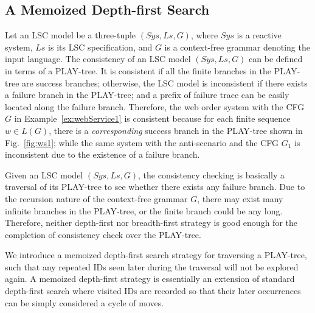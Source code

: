 \documentclass[]{llncs}
\begin{document}
\subsection{A Memoized Depth-first Search}

Let an LSC model be a three-tuple $(Sys, Ls, G)$, where
$Sys$ is a reactive system, $Ls$ is its LSC specification,
and $G$ is a context-free grammar denoting the input language.
The consistency of an LSC model $(Sys, Ls, G)$ can be defined in terms
of a PLAY-tree. It is consistent if all
the finite branches in the PLAY-tree are success branches;
otherwise, the LSC model
is inconsistent if there exists a failure branch in the PLAY-tree;
and a prefix of failure trace can be
easily located along the failure branch. Therefore,
the web order system with the CFG $G$
in Example~\ref{ex:webService1} is consistent because
for each finite sequence $w \in L(G)$, there is a
{\em corresponding} success branch in the PLAY-tree
shown in Fig.~\ref{fig:ws1};
while the same system with the anti-scenario and the CFG $G_1$
is inconsistent due to the existence of a failure branch.

Given an LSC model $(Sys, Ls, G)$, the consistency checking is basically
a traversal of its PLAY-tree to see whether there exists any failure branch.
Due to the recursion nature of the context-free grammar $G$,
there may exist many infinite branches in the PLAY-tree, or
the finite branch could be any long.
Therefore, neither depth-first nor breadth-first strategy
is good enough for the completion of consistency check over
the PLAY-tree.

We introduce a memoized depth-first search strategy for
traversing a PLAY-tree, such that
any repeated IDs seen later during the traversal will not
be explored again. A memoized depth-first strategy is
essentially an extension of standard depth-first search
where visited IDs are recorded so that their later occurrences
can be simply considered a cycle of moves.
\end{document}
